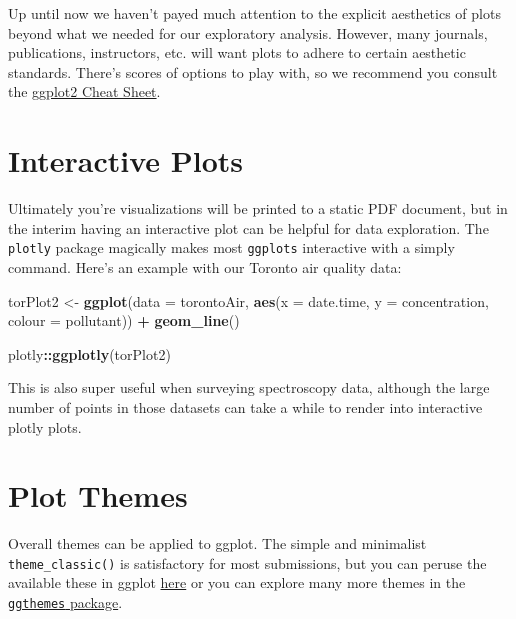 \documentclass[
]{book}
\newenvironment{Shaded}{\begin{snugshade}}{\end{snugshade}}
\newcommand{\AttributeTok}[1]{\textcolor[rgb]{0.13,0.29,0.53}{#1}}
\newcommand{\FunctionTok}[1]{\textcolor[rgb]{0.13,0.29,0.53}{\textbf{#1}}}
\newcommand{\NormalTok}[1]{#1}
\newcommand{\OtherTok}[1]{\textcolor[rgb]{0.56,0.35,0.01}{#1}}
\newcommand{\SpecialCharTok}[1]{\textcolor[rgb]{0.81,0.36,0.00}{\textbf{#1}}}
\begin{document}
Up until now we haven't payed much attention to the explicit aesthetics of plots beyond what we needed for our exploratory analysis. However, many journals, publications, instructors, etc. will want plots to adhere to certain aesthetic standards. There's scores of options to play with, so we recommend you consult the \href{https://raw.githubusercontent.com/rstudio/cheatsheets/master/data-visualization.pdf}{ggplot2 Cheat Sheet}.

\hypertarget{interactive-plots}{%
\section{Interactive Plots}\label{interactive-plots}}

Ultimately you're visualizations will be printed to a static PDF document, but in the interim having an interactive plot can be helpful for data exploration. The \texttt{plotly} package magically makes most \texttt{ggplots} interactive with a simply command. Here's an example with our Toronto air quality data:

\begin{Shaded}
\begin{Highlighting}[]
\NormalTok{torPlot2 }\OtherTok{\textless{}{-}} \FunctionTok{ggplot}\NormalTok{(}\AttributeTok{data =}\NormalTok{ torontoAir,}
       \FunctionTok{aes}\NormalTok{(}\AttributeTok{x =}\NormalTok{ date.time,}
           \AttributeTok{y =}\NormalTok{ concentration,}
           \AttributeTok{colour =}\NormalTok{ pollutant)) }\SpecialCharTok{+}
  \FunctionTok{geom\_line}\NormalTok{()}

\NormalTok{plotly}\SpecialCharTok{::}\FunctionTok{ggplotly}\NormalTok{(torPlot2)}
\end{Highlighting}
\end{Shaded}

This is also super useful when surveying spectroscopy data, although the large number of points in those datasets can take a while to render into interactive plotly plots.

\hypertarget{plot-themes}{%
\section{Plot Themes}\label{plot-themes}}

Overall themes can be applied to ggplot. The simple and minimalist \texttt{theme\_classic()} is satisfactory for most submissions, but you can peruse the available these in ggplot \href{https://ggplot2.tidyverse.org/reference/ggtheme.html}{here} or you can explore many more themes in the \href{https://yutannihilation.github.io/allYourFigureAreBelongToUs/ggthemes/}{\texttt{ggthemes} package}.
\end{document}
